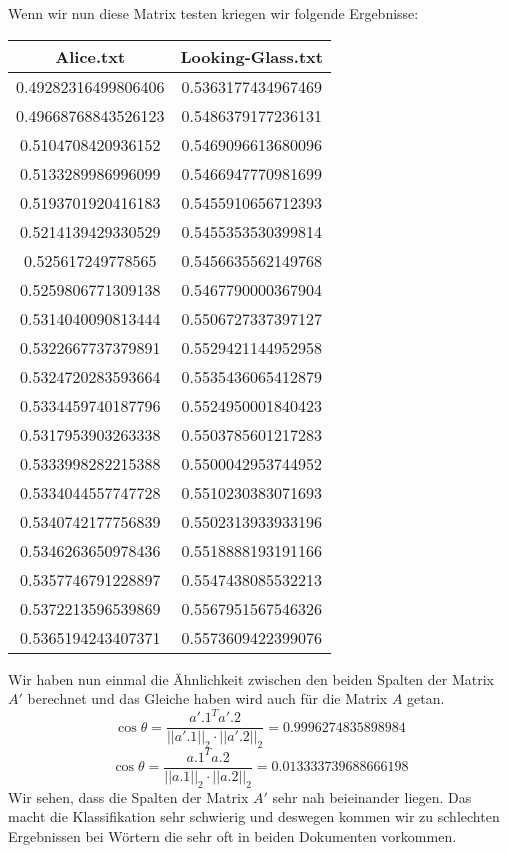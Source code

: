 \documentclass{article}
\begin{document}
Wenn wir nun diese Matrix testen kriegen wir folgende Ergebnisse:
 \begin{center}
\begin{tabular}{|c|c|}
    \hline
    \textbf{Alice.txt} & \textbf{Looking-Glass.txt} \\
    \hline
    0.49282316499806406 & 0.5363177434967469 \\
    0.49668768843526123 & 0.5486379177236131 \\
    0.5104708420936152 & 0.5469096613680096 \\
    0.5133289986996099 & 0.5466947770981699 \\
    0.5193701920416183 & 0.5455910656712393 \\
    0.5214139429330529 & 0.5455353530399814 \\
    0.525617249778565 & 0.5456635562149768 \\
    0.5259806771309138 & 0.5467790000367904 \\
    0.5314040090813444 & 0.5506727337397127 \\
    0.5322667737379891 & 0.5529421144952958 \\
    0.5324720283593664 & 0.5535436065412879 \\
    0.5334459740187796 & 0.5524950001840423 \\
    0.5317953903263338 & 0.5503785601217283 \\
    0.5333998282215388 & 0.5500042953744952 \\
    0.5334044557747728 & 0.5510230383071693 \\
    0.5340742177756839 & 0.5502313933933196 \\
    0.5346263650978436 & 0.5518888193191166 \\
    0.5357746791228897 & 0.5547438085532213 \\
    0.5372213596539869 & 0.5567951567546326 \\
    0.5365194243407371 & 0.5573609422399076 \\
    \hline
\end{tabular}
\end{center} 
Wir haben nun einmal die Ähnlichkeit zwischen den beiden Spalten der Matrix $A'$ berechnet und das Gleiche haben wird auch für die Matrix $A$ getan.\newpage
$$\cos\theta=\frac{a'.1^Ta'.2}{||a'.1||_2\cdot||a'.2||_2}=0.9996274835898984$$
$$\cos\theta=\frac{a.1^Ta.2}{||a.1||_2\cdot||a.2||_2}=0.013333739688666198$$
Wir sehen, dass die Spalten der Matrix $A'$ sehr nah beieinander liegen. Das macht die Klassifikation sehr schwierig und deswegen kommen wir zu schlechten Ergebnissen bei Wörtern die sehr oft in beiden Dokumenten vorkommen.
\end{document}
